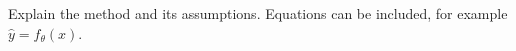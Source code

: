Explain the method and its assumptions. Equations can be included, for example $\hat y=f_{\theta}(x)$.
